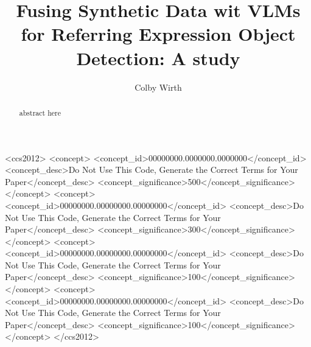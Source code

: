 \documentclass[sigconf]{acmart}
\begin{document}
\title{Fusing Synthetic Data wit VLMs for Referring Expression Object Detection: A study}

\author{Colby Wirth}
\orcid{}






\renewcommand{\shortauthors}{Trovato et al.}

\begin{abstract}
	abstract here
\end{abstract}

\begin{CCSXML}
<ccs2012>
 <concept>
  <concept_id>00000000.0000000.0000000</concept_id>
  <concept_desc>Do Not Use This Code, Generate the Correct Terms for Your Paper</concept_desc>
  <concept_significance>500</concept_significance>
 </concept>
 <concept>
  <concept_id>00000000.00000000.00000000</concept_id>
  <concept_desc>Do Not Use This Code, Generate the Correct Terms for Your Paper</concept_desc>
  <concept_significance>300</concept_significance>
 </concept>
 <concept>
  <concept_id>00000000.00000000.00000000</concept_id>
  <concept_desc>Do Not Use This Code, Generate the Correct Terms for Your Paper</concept_desc>
  <concept_significance>100</concept_significance>
 </concept>
 <concept>
  <concept_id>00000000.00000000.00000000</concept_id>
  <concept_desc>Do Not Use This Code, Generate the Correct Terms for Your Paper</concept_desc>
  <concept_significance>100</concept_significance>
 </concept>
</ccs2012>
\end{CCSXML}
\end{document}
